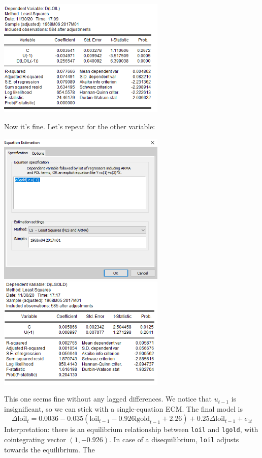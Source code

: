 \documentclass[11pt, a4paper]{article}
\begin{document}
\begin{enumerate}
\begin{enumerate}
\begin{center}
\includegraphics[width=0.6\textwidth]{vecm1}
\end{center}
Now it's fine. Let's repeat for the other variable:
\begin{center}
\includegraphics[width=0.6\textwidth]{vecmeviews2}
\includegraphics[width=0.6\textwidth]{vecm2}
\end{center}
This one seems fine without any lagged differences. We notice that $u_{t-1}$ is insignificant, so we can stick with a single-equation ECM. The final model is
\[
\Delta \textrm{loil}_t=0.0036-0.035(\textrm{loil}_{t-1}-0.926\textrm{lgold}_{t-1}+2.26)+0.25\Delta\textrm{loil}_{t-1}+e_{1t}
\]
Interpretation: there is an equilibrium relationship between \texttt{loil} and \texttt{lgold}, with cointegrating vector $(1, -0.926)$. In case of a disequilibrium, \texttt{loil} adjusts towards the equilibrium. The

\end{enumerate}
\end{enumerate}
\end{document}
